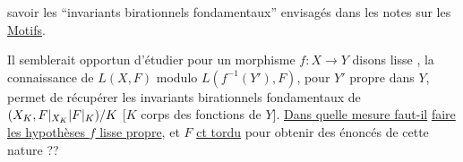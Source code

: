 savoir les ``invariants birationnels fondamentaux''
 envisagés dans les notes sur les \uline{Motifs}.

Il semblerait opportun d'étudier 
pour un morphisme $f:X\longrightarrow Y$
disons lisse ,  la connaissance de
$L(X,F)$ modulo $L(f^{-1}(Y'),F)$,
pour $Y'$ propre dans $Y$, permet de récupérer
les invariants birationnels fondamentaux
de $(X_K,F\vert_{X_K}|F\vert_K)/K$
[$K$ corps des fonctions de
$Y$]. \uline{Dans quelle mesure faut-il}
\uline{faire les hypothèses $f$ lisse propre}, et $F$
\uline{ct tordu} pour obtenir des énoncés
de cette nature ??
